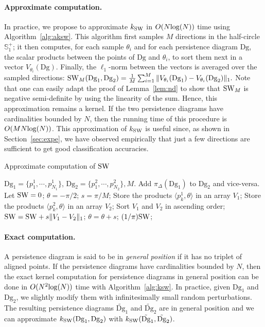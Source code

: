 \documentclass[11pt]{article}
\newcommand{\Dg}{\mathrm{Dg}}
\newcommand{\kSW}{k_{\rm SW}}
\newcommand{\SW}{{\rm SW}}
\begin{document}
\paragraph*{Approximate computation.} In practice, we propose to approximate $\kSW$ in $O(N{\rm log}(N))$
time using Algorithm~\ref{alg:aksw}. This algorithm first samples $M$ directions
in the half-circle $\mathbb{S}^+_1$; it then computes, for
each sample $\theta_i$ and for each persistence diagram $\Dg$, the scalar
products between the points of $\Dg$ and $\theta_i$, to sort them next in a
vector $V_{\theta_i}(\Dg)$. Finally, the $\ell_1$-norm between the vectors 
is averaged over the sampled directions:
${\rm SW}_M(\Dg_1,\Dg_2)=\frac 1M \sum_{i=1}^M \|V_{\theta_i}(\Dg_1)-V_{\theta_i}(\Dg_2)\|_1.$
Note that one can easily adapt the proof of Lemma~\ref{lem:nd} to show that ${\rm SW}_M$ 
is negative semi-definite
by using the linearity of the sum. Hence, this approximation remains a kernel.
If the two persistence diagrams have cardinalities bounded by $N$,
then the running time of this procedure is $O(MN{\rm log}(N))$. 
This approximation of $\kSW$  is useful since, as shown in
Section~\ref{sec:expe}, we have observed empirically that just a few directions are sufficient to get good classification accuracies.

\begin{algorithm}
\caption{Approximate computation of $\SW$}
\label{alg:aksw}
\begin{algorithmic}
 $\Dg_1=\{p^1_1,\cdots,p^1_{N_1}\}$, $\Dg_2=\{p^2_1,\cdots,p^2_{N_2}\}, M$.
\STATE Add $\pi_\Delta(\Dg_1)$ to $\Dg_2$ and vice-versa.
\STATE Let $\SW=0$; $\theta=-\pi/2$; $s=\pi/M$;
	\STATE Store the products $\langle p_k^1,\theta\rangle$ in an array $V_1$;
	\STATE Store the
 products $\langle p_k^2,\theta\rangle$ in an array $V_2$;
	\STATE Sort $V_1$ and $V_2$ in ascending order;
	\STATE $\SW=\SW+s \|V_1-V_2\|_1$;
	\STATE $\theta= \theta + s$;
\ENDFOR
{} $(1/\pi)\SW$;
\end{algorithmic}
\end{algorithm}  

\paragraph*{Exact computation.} A persistence diagram is said to be in {\em general position} if it has no triplet of aligned points.  
If the persistence diagrams have cardinalities bounded by $N$, then the exact kernel computation for persistence diagrams in general position can be done in $O(N^2{\rm log}(N))$ time with 
Algorithm~\ref{alg:ksw}. In practice, given $\Dg_1$ and $\Dg_2$, we slightly modify them with infinitesimally small random perturbations. The resulting persistence diagrams 
$\tilde{\Dg}_1$ and $\tilde{\Dg}_2$ are in general position and we can approximate
$\kSW(\Dg_1,\Dg_2)$ with $\kSW(\tilde{\Dg}_1,\tilde{\Dg}_2)$.	
\end{document}
